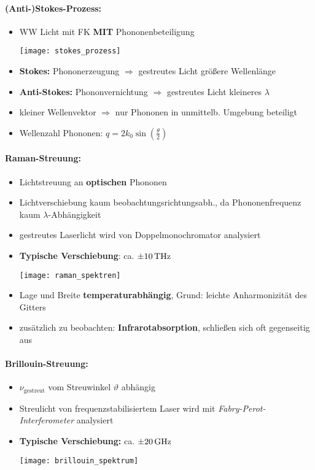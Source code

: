\documentclass[a4paper,12pt]{article}
\begin{document}
\paragraph*{(Anti-)Stokes-Prozess:}\begin{itemize}
	\item WW Licht mit FK \textbf{MIT} Phononenbeteiligung\\
	\begin{center}
		\texttt{[image: stokes\_prozess]}
	\end{center}
	\item \textbf{Stokes:} Phononerzeugung $ \Rightarrow $ gestreutes Licht größere Wellenlänge
	\item \textbf{Anti-Stokes:} Phononvernichtung $ \Rightarrow $ gestreutes Licht kleineres $ \lambda $
	\item kleiner Wellenvektor $ \Rightarrow $ nur Phononen in unmittelb. Umgebung beteiligt
	\item Wellenzahl Phononen: $ q = 2k_0 \sin \left(\frac{\theta}{2}\right) $
	\end{itemize}
\paragraph*{Raman-Streuung:}\begin{itemize}
	\item Lichtstreuung an \textbf{optischen} Phononen
	\item Lichtverschiebung kaum  beobachtungsrichtungsabh., da Phononenfrequenz kaum $ \lambda $-Abhängigkeit
	\item gestreutes Laserlicht wird von Doppelmonochromator analysiert
	\item \textbf{Typische Verschiebung}: ca. $ \SI{\pm10}{\tera\hertz} $
	\begin{center}
		\texttt{[image: raman\_spektren]}
	\end{center}
	\item Lage und Breite \textbf{temperaturabhängig}, Grund: leichte Anharmonizität des Gitters
	\item zusätzlich zu beobachten: \textbf{Infrarotabsorption}, schließen sich oft gegenseitig aus
\end{itemize}
\paragraph*{Brillouin-Streuung:}\begin{itemize}
	\item $ \nu_\text{gestreut} $ vom Streuwinkel $ \vartheta $ abhängig
	\item Streulicht von frequenzstabilisiertem Laser wird mit \emph{Fabry-Perot-Interferometer} analysiert
	\item \textbf{Typische Verschiebung:} ca. $ \SI{\pm20}{\giga\hertz} $
		\begin{center}
			\texttt{[image: brillouin\_spektrum]}
		\end{center}
\end{itemize}
\end{document}
